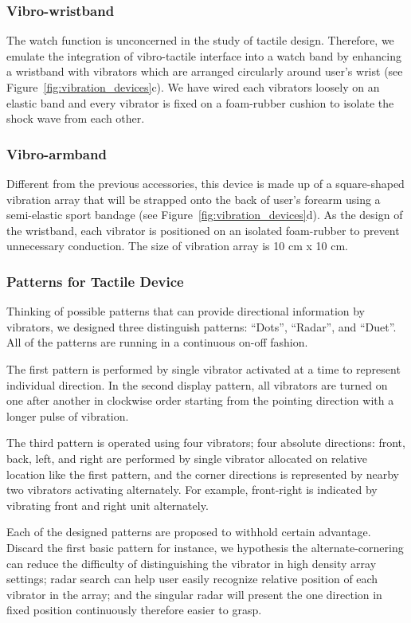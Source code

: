 \documentclass{sigchi}
\begin{document}
\subsubsection{Vibro-wristband}
The watch function is unconcerned in the study of tactile design. Therefore, we emulate the integration of vibro-tactile interface into a watch band by enhancing a wristband with vibrators which are arranged circularly around user's wrist (see Figure~\ref{fig:vibration_devices}c). We have wired each vibrators loosely on an elastic band and every vibrator is fixed on a foam-rubber cushion to isolate the shock wave from each other.

\subsubsection{Vibro-armband}
Different from the previous accessories, this device is made up of a square-shaped vibration array that will be strapped onto the back of user's forearm using a semi-elastic sport bandage (see Figure~\ref{fig:vibration_devices}d). As the design of the wristband, each vibrator is positioned on an isolated foam-rubber to prevent unnecessary conduction. The size of vibration array is 10 cm x 10 cm.


\subsubsection{Patterns for Tactile Device}
Thinking of possible patterns that can provide directional information by vibrators, we designed three distinguish patterns: \textquotedblleft Dots\textquotedblright, \textquotedblleft Radar\textquotedblright, and \textquotedblleft Duet\textquotedblright.
All of the patterns are running in a continuous on-off fashion.

The first pattern is performed by single vibrator activated at a time to represent individual direction. In the second display pattern, all vibrators are turned on one after another in clockwise order starting from the pointing direction with a longer pulse of vibration. 

The third pattern is operated using four vibrators; four absolute directions: front, back, left, and right are performed by single vibrator allocated on relative location like the first pattern, and the corner directions is represented by nearby two vibrators activating alternately. For example, front-right is indicated by vibrating front and right unit alternately.

Each of the designed patterns are proposed to withhold certain advantage. Discard the first basic pattern for instance, we hypothesis the alternate-cornering can reduce the difficulty of distinguishing the vibrator in high density array settings; radar search can help user easily recognize relative position of each vibrator in the array; and the singular radar will present the one direction in fixed position continuously therefore easier to grasp.
\end{document}
